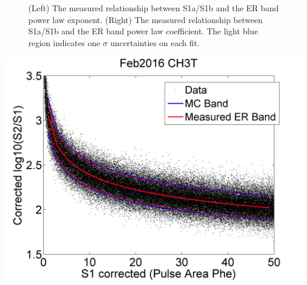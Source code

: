 \begin{figure} 
\centering
{}
\qquad
{}
\caption{ (Left) The measured relationship between S1a/S1b and the ER band power law exponent. (Right) The measured relationship between S1a/S1b and the ER band power law coefficient. The light blue region indicates one $\sigma$ uncertainties on each fit.}
\label{ERBand_S1aS1bToER}
\end{figure}


\begin{center}
\includegraphics[scale=0.45]{Run04Corrections/Feb2016_ERPrediction.png}
 \label{Feb2016ERPred}
\end{center}
